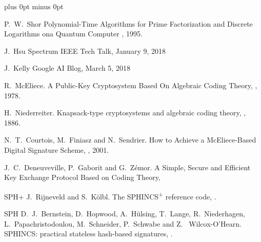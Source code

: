 \documentclass[a4paper,11pt]{article}
\begin{document}
\begin{otherlanguage}{english}
\begin{multicols}{2}
\vspace{1cm}




\begin{thebibliography}{1}
\itemsep=0cm plus 0pt minus 0pt

P.~W.~Shor
\newblock Polynomial-Time Algorithms for Prime Factorization and Discrete Logarithms ona Quantum Computer
, 1995.

  J.~Hsu
  \newblock Spectrum IEEE Tech Talk, January 9, 2018

  J.~Kelly
  \newblock Google AI Blog, March 5, 2018

R.~McEliece.
\newblock A Public-Key Cryptosystem Based On Algebraic Coding Theory,
, 1978.

H.~Niederreiter.
\newblock Knapsack-type cryptosystems and algebraic coding theory,
, 1886.

N.~T.~Courtois, M.~Finiasz and N.~Sendrier.
\newblock How to Achieve a McEliece-Based Digital Signature Scheme,
, 2001.

J.~C.~Deneuveville, P.~Gaborit and G.~Zémor.
\newblock A Simple, Secure and Efficient Key Exchange Protocol Based on Coding Theory,

\bibitem
{SPH+}
J.~Rijneveld and S.~Kölbl.
\newblock The SPHINCS\textsuperscript{+} reference code,
.

\bibitem
{SPH}
D.~J.~Bernstein, D.~Hopwood, A.~Hülsing, T.~Lange, R.~Niederhagen, L.~Papachristodoulou, M.~Schneider, P.~Schwabe and Z.~ Wilcox-O’Hearn.
\newblock SPHINCS: practical stateless hash-based signatures,
.


\end{thebibliography}
\end{multicols}
\end{otherlanguage}
\end{document}
